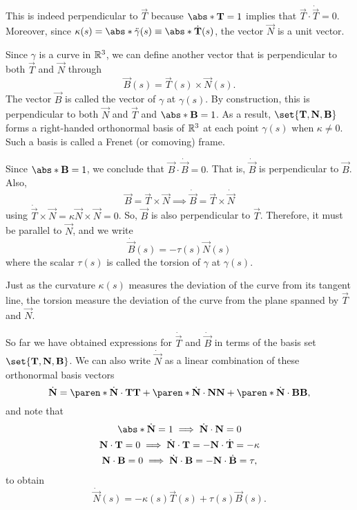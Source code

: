 \documentclass[11pt]{penrose}
\newcommand{\vT}{\vec{T}}
\newcommand{\vN}{\vec{N}}
\newcommand{\vB}{\vec{B}}
\begin{document}
This is indeed perpendicular to $\vT$ because $\abs*{\vT} = 1$ implies that $\vT \cdot \dot{\vT} = 0$. Moreover, since $\kappa(s) = \abs*{\ddot{\gamma}(s)} \equiv \abs*{\dot{\vT}(s)}$, the vector $\vN$ is a unit vector.

Since $\gamma$ is a curve in $\mathbb{R}^3$, we can define another vector that is perpendicular to both $\vT$ and $\vN$ through
\begin{equation}
    \vB(s) = \vT(s) \times \vN(s).
    \label{eq:bivector-dfn}
\end{equation}
The vector $\vB$ is called the  vector of $\gamma$ at $\gamma(s)$. By construction, this is perpendicular to both $\vN$ and $\vT$ and $\abs*{\vB} = 1$. As a result, $\set{\vT, \vN, \vB}$ forms a right-handed orthonormal basis of $\mathbb{R}^3$ at each point $\gamma(s)$ when $\kappa \neq 0$. Such a basis is called a Frenet (or comoving) frame.

Since $\abs*{\vB} = 1$, we conclude that $\vB \cdot \dot{\vB} = 0$. That is, $\dot{\vB}$ is perpendicular to $\vB$. Also,
\begin{equation}
    \vB = \vT \times \vN
    \implies
    \dot{\vB} = \vT \times \dot{\vN}
\end{equation}
using $\dot{\vT} \times \vN = \kappa \vN \times \vN = 0$. So, $\vB$ is also perpendicular to $\vT$. Therefore, it must be parallel to $\vN$, and we write
\begin{equation}
    \dot{\vB}(s) = - \tau(s) \vN(s)
\end{equation}
where the scalar $\tau(s)$ is called the torsion of $\gamma$ at $\gamma(s)$.

Just as the curvature $\kappa(s)$ measures the deviation of the curve from its tangent line, the torsion measure the deviation of the curve from the plane spanned by $\vT$ and $\vN$.

So far we have obtained expressions for $\dot{\vT}$ and $\dot{\vB}$ in terms of the basis set $\set{\vT, \vN, \vB}$. We can also write $\dot{\vN}$ as a linear combination of these orthonormal basis vectors
\begin{equation}
    \dot{\vN} = \paren*{\dot{\vN}\cdot\vT} \vT + \paren*{\dot{\vN}\cdot\vN} \vN + \paren*{\dot{\vN}\cdot\vB} \vB,
\end{equation}
and note that
\begin{gather}
    \abs*{\dot{\vN}} = 1 \implies \dot{\vN}\cdot\vN = 0\\
    \vN \cdot \vT = 0 \implies \dot{\vN}\cdot\vT = -\vN \cdot \dot{\vT} = -\kappa\\
    \vN \cdot \vB = 0 \implies \dot{\vN}\cdot\vB = -\vN \cdot \dot{\vB} = \tau,
\end{gather}
to obtain
\begin{equation}
    \dot{\vN}(s) = -\kappa(s) \vT(s) + \tau(s) \vB(s).
\end{equation}
\end{document}
